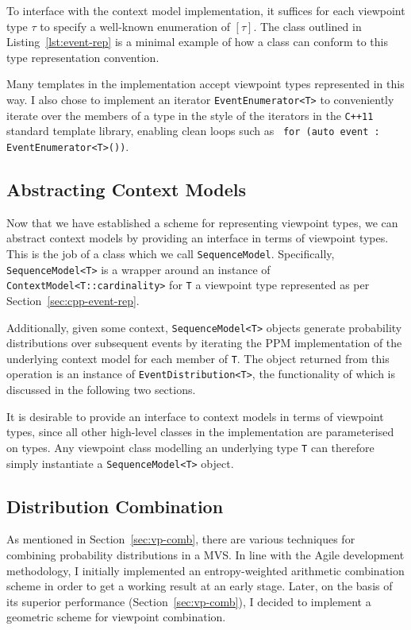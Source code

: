 \documentclass[12pt,a4paper,twoside,openright]{report}
\newcommand{\cppi}[1]{{\small \texttt{#1}}}
\begin{document}
To interface with the context model implementation, it suffices for each
viewpoint type $\tau$ to specify a well-known enumeration of $[\tau]$. The class
outlined in Listing~\ref{lst:event-rep} is a minimal example of how a class can
conform to this type representation convention.

Many templates in the implementation accept viewpoint types represented in this
way. I also chose to implement an iterator \texttt{EventEnumerator<T>} to
conveniently iterate over the members of a type in the style of the iterators in
the \texttt{C++11} standard template library, enabling clean loops such as~
\cppi{for (auto event : EventEnumerator<T>())}.

\subsection{Abstracting Context Models}

Now that we have established a scheme for representing viewpoint types, we can
abstract context models by providing an interface in terms of viewpoint types.
This is the job of a class which we call \texttt{SequenceModel}.  Specifically,
\texttt{SequenceModel<T>} is a wrapper around an instance of
\texttt{ContextModel<T::cardinality>} for \texttt{T} a viewpoint type
represented as per Section~\ref{sec:cpp-event-rep}. 

Additionally, given some context, \texttt{SequenceModel<T>} objects generate
probability distributions over subsequent events by iterating the PPM
implementation of the underlying context model for each member of \texttt{T}.
The object returned from this operation is an instance of
\texttt{EventDistribution<T>}, the functionality of which is discussed in the
following two sections.

It is desirable to provide an interface to context models in terms of viewpoint
types, since all other high-level classes in the implementation are
parameterised on types. Any viewpoint class modelling an underlying type
\texttt{T} can therefore simply instantiate a \texttt{SequenceModel<T>} object.

\subsection{Distribution Combination}

As mentioned in Section~\ref{sec:vp-comb}, there are various techniques for
combining probability distributions in a MVS. In line with the Agile development
methodology, I initially implemented an entropy-weighted arithmetic combination
scheme in order to get a working result at an early stage. Later, on the basis
of its superior performance (Section~\ref{sec:vp-comb}), I decided to implement
a geometric scheme for viewpoint combination.  
\end{document}
